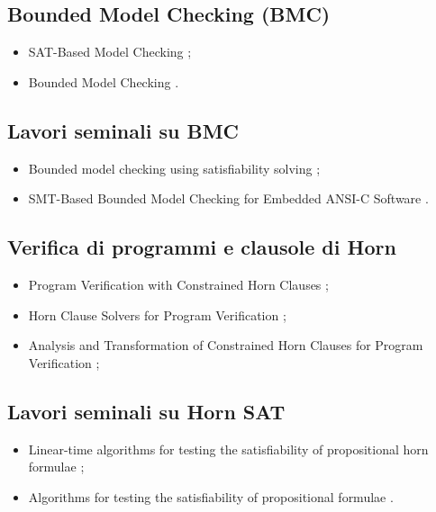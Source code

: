 \subsection*{Bounded Model Checking (BMC)}
\begin{itemize}

\item SAT-Based Model Checking \cite{biere2018satcheck};

\item Bounded Model Checking \cite{biere2021bmc}.

\end{itemize}

\subsection*{Lavori seminali su BMC}
\begin{itemize}

\item Bounded model checking using satisfiability solving \cite{clarke2001bmc};

\item SMT-Based Bounded Model Checking for Embedded ANSI-C Software \cite{cordeiro2009smtbmc}.

\end{itemize}

\subsection*{Verifica di programmi e clausole di Horn}
\begin{itemize}

\item Program Verification with Constrained Horn Clauses \cite{gurfinkel2022chc};

\item Horn Clause Solvers for Program Verification \cite{bjorner2015chc};

\item Analysis and Transformation of Constrained Horn Clauses for Program Verification \cite{deangelis2021chc};

\end{itemize}

\subsection*{Lavori seminali su Horn SAT}
\begin{itemize}

\item Linear-time algorithms for testing the satisfiability of propositional horn formulae \cite{dowling1984hornsat};

\item Algorithms for testing the satisfiability of propositional formulae \cite{gallo1989hornsat}.

\end{itemize}


